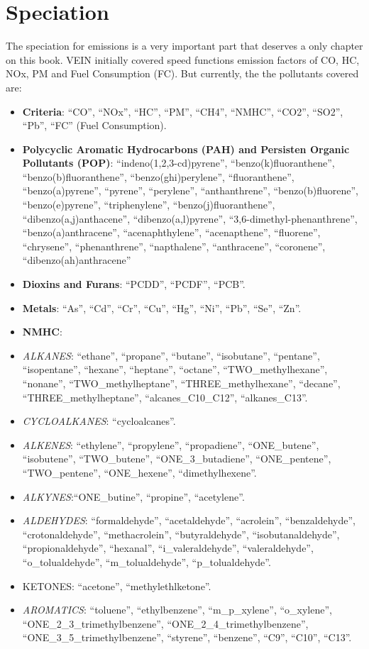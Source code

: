 \documentclass[12pt,graybox,envcountchap,sectrefs]{krantz}
\providecommand{\tightlist}{%
  \setlength{\itemsep}{0pt}\setlength{\parskip}{0pt}}
\theoremstyle{definition}
\theoremstyle{definition}
\theoremstyle{definition}
\theoremstyle{remark}
\begin{document}
\chapter{Speciation}\label{he}

The speciation for emissions is a very important part that deserves a
only chapter on this book. VEIN initially covered speed functions
emission factors of CO, HC, NOx, PM and Fuel Consumption (FC). But
currently, the the pollutants covered are:

\begin{itemize}
\tightlist
\item
  \textbf{Criteria}: ``CO'', ``NOx'', ``HC'', ``PM'', ``CH4'', ``NMHC'',
  ``CO2'', ``SO2'', ``Pb'', ``FC'' (Fuel Consumption).
\item
  \textbf{Polycyclic Aromatic Hydrocarbons (PAH) and Persisten Organic
  Pollutants (POP)}: ``indeno(1,2,3-cd)pyrene'',
  ``benzo(k)fluoranthene'', ``benzo(b)fluoranthene'',
  ``benzo(ghi)perylene'', ``fluoranthene'', ``benzo(a)pyrene'',
  ``pyrene'', ``perylene'', ``anthanthrene'', ``benzo(b)fluorene'',
  ``benzo(e)pyrene'', ``triphenylene'', ``benzo(j)fluoranthene'',
  ``dibenzo(a,j)anthacene'', ``dibenzo(a,l)pyrene'',
  ``3,6-dimethyl-phenanthrene'', ``benzo(a)anthracene'',
  ``acenaphthylene'', ``acenapthene'', ``fluorene'', ``chrysene'',
  ``phenanthrene'', ``napthalene'', ``anthracene'', ``coronene'',
  ``dibenzo(ah)anthracene''
\item
  \textbf{Dioxins and Furans}: ``PCDD'', ``PCDF'', ``PCB''.
\item
  \textbf{Metals}: ``As'', ``Cd'', ``Cr'', ``Cu'', ``Hg'', ``Ni'',
  ``Pb'', ``Se'', ``Zn''.
\item
  \textbf{NMHC}:
\item
  \emph{ALKANES}: ``ethane'', ``propane'', ``butane'', ``isobutane'',
  ``pentane'', ``isopentane'', ``hexane'', ``heptane'', ``octane'',
  ``TWO\_methylhexane'', ``nonane'', ``TWO\_methylheptane'',
  ``THREE\_methylhexane'', ``decane'', ``THREE\_methylheptane'',
  ``alcanes\_C10\_C12'', ``alkanes\_C13''.
\item
  \emph{CYCLOALKANES}: ``cycloalcanes''.
\item
  \emph{ALKENES}: ``ethylene'', ``propylene'', ``propadiene'',
  ``ONE\_butene'', ``isobutene'', ``TWO\_butene'',
  ``ONE\_3\_butadiene'', ``ONE\_pentene'', ``TWO\_pentene'',
  ``ONE\_hexene'', ``dimethylhexene''.
\item
  \emph{ALKYNES}:``ONE\_butine'', ``propine'', ``acetylene''.
\item
  \emph{ALDEHYDES}: ``formaldehyde'', ``acetaldehyde'', ``acrolein'',
  ``benzaldehyde'', ``crotonaldehyde'', ``methacrolein'',
  ``butyraldehyde'', ``isobutanaldehyde'', ``propionaldehyde'',
  ``hexanal'', ``i\_valeraldehyde'', ``valeraldehyde'',
  ``o\_tolualdehyde'', ``m\_tolualdehyde'', ``p\_tolualdehyde''.
\item
  KETONES: ``acetone'', ``methylethlketone''.
\item
  \emph{AROMATICS}: ``toluene'', ``ethylbenzene'', ``m\_p\_xylene'',
  ``o\_xylene'', ``ONE\_2\_3\_trimethylbenzene'',
  ``ONE\_2\_4\_trimethylbenzene'', ``ONE\_3\_5\_trimethylbenzene'',
  ``styrene'', ``benzene'', ``C9'', ``C10'', ``C13''.
\end{itemize}
\end{document}

